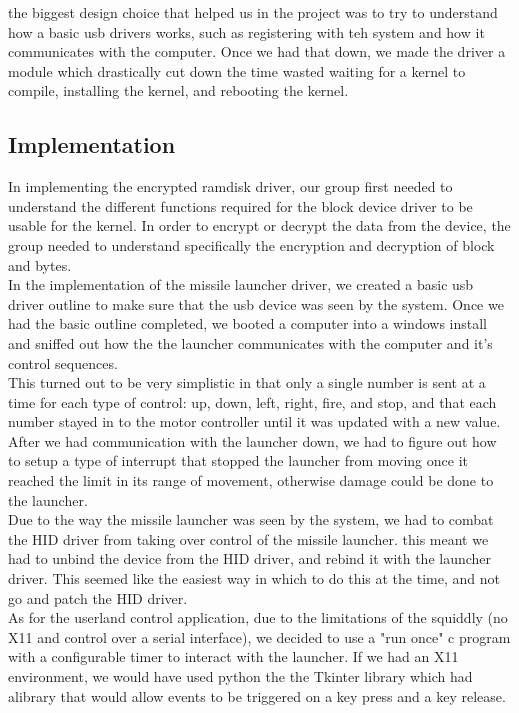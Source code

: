 \documentclass[letterpaper,10pt,titlepage]{article}
\begin{document}
the biggest design choice that helped us in the project was to try to understand how a basic usb drivers works, such as registering with teh system and how it communicates with the computer. Once we had that down, we made the driver a module which drastically cut down the time wasted waiting for a kernel to compile, installing the kernel, and rebooting the kernel.

\subsection*{Implementation}

In implementing the encrypted ramdisk driver, our group first needed to understand the different functions required for the block device driver to be usable for the kernel. In order to encrypt or decrypt the data from the device, the group needed to understand specifically the encryption and decryption of block and bytes.\\

In the implementation of the missile launcher driver, we created a basic usb driver outline to make sure that the usb device was seen by the system. Once we had the basic outline completed, we booted a computer into a windows install and sniffed out how the the launcher communicates with the computer and it's control sequences.\\

This turned out to be very simplistic in that only a single number is sent at a time for each type of control: up, down, left, right, fire, and stop, and that each number stayed in to the motor controller until it was updated with a new value. \\

After we had communication with the launcher down, we had to figure out how to setup a type of interrupt that stopped the launcher from moving once it reached the limit in its range of movement, otherwise damage could be done to the launcher.\\

Due to the way the missile launcher was seen by the system, we had to combat the HID driver from taking over control of the missile launcher. this meant we had to unbind the device from the HID driver, and rebind it with the launcher driver. This seemed like the easiest way in which to do this at the time, and not go and patch the HID driver.\\

As for the userland control application, due to the limitations of the squiddly (no X11 and control over a serial interface), we decided to use a "run once" c program with a configurable timer to interact with the launcher. If we had an X11 environment, we would have used python the the Tkinter library which had alibrary that would allow events to be triggered on a key press and a key release.
\end{document}
